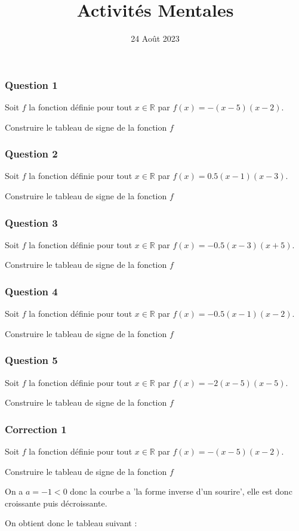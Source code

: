 \documentclass[15pt, mathserif]{beamer}
\title{Activités Mentales}
\date{24 Août 2023}
\newcommand{\R}{\mathbb{R}}			%
\begin{document}
\begin{frame}
    \titlepage
\end{frame}

\begin{frame} 
	\frametitle{Question 1}
 Soit $f$ la fonction définie pour tout $x \in \R$ par $f(x)=-(x-5)(x-2)$. 
 
  Construire le tableau de signe de la fonction $f$\end{frame}


\begin{frame} 
	\frametitle{Question 2}
 Soit $f$ la fonction définie pour tout $x \in \R$ par $f(x)=0.5(x-1)(x-3)$. 
 
  Construire le tableau de signe de la fonction $f$\end{frame}


\begin{frame} 
	\frametitle{Question 3}
 Soit $f$ la fonction définie pour tout $x \in \R$ par $f(x)=-0.5(x-3)(x+5)$. 
 
  Construire le tableau de signe de la fonction $f$\end{frame}


\begin{frame} 
	\frametitle{Question 4}
 Soit $f$ la fonction définie pour tout $x \in \R$ par $f(x)=-0.5(x-1)(x-2)$. 
 
  Construire le tableau de signe de la fonction $f$\end{frame}


\begin{frame} 
	\frametitle{Question 5}
 Soit $f$ la fonction définie pour tout $x \in \R$ par $f(x)=-2(x-5)(x-5)$. 
 
  Construire le tableau de signe de la fonction $f$\end{frame}


\begin{frame}
\vspace{-10mm}
	\frametitle{Correction 1}
 \vspace*{1cm} Soit $f$ la fonction définie pour tout $x \in \R$ par $f(x)=-(x-5)(x-2)$. 
 
  Construire le tableau de signe de la fonction $f$ 
 
 On a $a=-1<0$ donc la courbe a 'la forme inverse d'un sourire', elle est donc croissante puis décroissante.
 
 On obtient donc le tableau suivant : 
 \begin{center} 
 \end{center} 
\end{frame}
\end{document}
